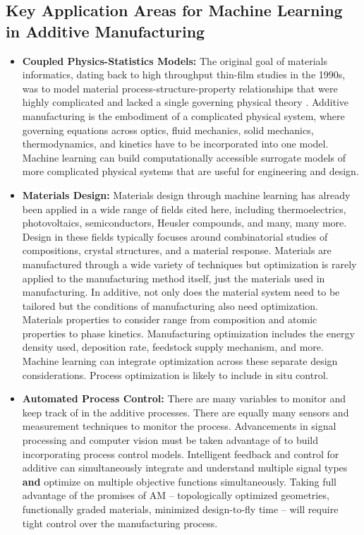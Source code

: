 \subsection{Key Application Areas for Machine Learning in Additive Manufacturing}
\begin{itemize}
	\item \textbf{Coupled Physics-Statistics Models:} The original goal of materials informatics, dating back to high throughput thin-film studies in the 1990s, was to model material process-structure-property relationships that were highly complicated and lacked a single governing physical theory \cite{Xiang1995}. Additive manufacturing is the embodiment of a complicated physical system, where governing equations across optics, fluid mechanics, solid mechanics, thermodynamics, and kinetics have to be incorporated into one model. Machine learning can build computationally accessible surrogate models of more complicated physical systems that are useful for engineering and design. 
	
	\item \textbf{Materials Design:} Materials design through machine learning has already been applied in a wide range of fields cited here, including thermoelectrics, photovoltaics, semiconductors, Heusler compounds, and many, many more. Design in these fields typically focuses around combinatorial studies of compositions, crystal structures, and a material response. Materials are manufactured through a wide variety of techniques but optimization is rarely applied to the manufacturing method itself, just the materials used in manufacturing. In additive, not only does the material system need to be tailored but the conditions of manufacturing also need optimization. Materials properties to consider range from composition and atomic properties to phase kinetics. Manufacturing optimization includes the energy density used, deposition rate, feedstock supply mechanism, and more. Machine learning can integrate optimization across these separate design considerations. Process optimization is likely to include in situ control.
	
	\item \textbf{Automated Process Control:} There are many variables to monitor and keep track of in the additive processes. There are equally many sensors and measurement techniques to monitor the process. Advancements in signal processing and computer vision must be taken advantage of to build incorporating process control models. Intelligent feedback and control for additive can simultaneously integrate and understand multiple signal types \textbf{and} optimize on multiple objective functions simultaneously. Taking full advantage of the promises of AM -- topologically optimized geometries, functionally graded materials, minimized design-to-fly time -- will require tight control over the manufacturing process.
\end{itemize}

